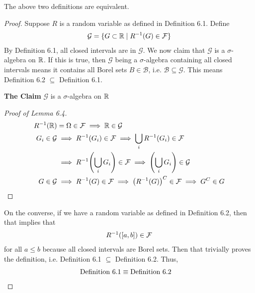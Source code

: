 \begin{proposition}
    The above two definitions are equivalent.
\end{proposition}
\begin{proof}
    Suppose $R$ is a random variable as defined in Definition 6.1. Define
    \begin{align}
        \mathcal{G} = \{ G\subset \mathbb{R} \mid R^{-1}(G) \in \mathcal{F} \}
    \end{align}
    By Definition 6.1, all closed intervals are in $\mathcal{G}$. We now claim that $\mathcal{G}$ is a $\sigma$-algebra on $\mathbb{R}$. If this is true, then $\mathcal{G}$ being a $\sigma$-algebra containing all closed intervals means it contains all Borel sets $B \in \mathcal{B}$, i.e. $\mathcal{B} \subseteq \mathcal{G}$. This means Definition 6.2 $\subseteq$ Definition 6.1.
    \begin{lemma}
        \textbf{The Claim} $\mathcal{G}$ is a $\sigma$-algebra on $\mathbb{R}$
    \end{lemma}
    \begin{proof}[Proof of Lemma 6.4]
        \begin{align}
            R^{-1}(\mathbb{R}) &= \Omega \in \mathcal{F} \implies \mathbb{R} \in \mathcal{G}\\
            G_i \in \mathcal{G} &\implies R^{-1}(G_i) \in \mathcal{F} \implies \bigcup_i R^{-1}(G_i) \in \mathcal{F}\\
            &\implies R^{-1}\qty(\bigcup_i G_i) \in \mathcal{F} \implies \qty(\bigcup_i G_i) \in \mathcal{G}\\
            G \in \mathcal{G} &\implies R^{-1}(G) \in \mathcal{F} \implies \qty(R^{-1}(G))^C \in \mathcal{F} \implies G^C \in G
        \end{align}
    \end{proof}
    On the converse, if we have a random variable as defined in Definition 6.2, then that implies that
    \begin{align}
        R^{-1}([a,b]) \in \mathcal{F}
    \end{align}
    for all $a \le b$ because all closed intervals are Borel sets. Then that trivially proves the definition, i.e. Definition 6.1 $\subseteq$ Definition 6.2. Thus,
    \begin{align}
        \text{Definition 6.1} \equiv \text{Definition 6.2} & \qedhere
    \end{align}
\end{proof}

